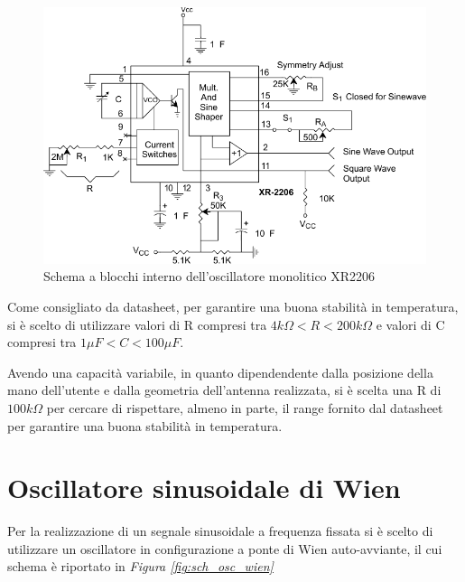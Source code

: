 \documentclass[titlepage]{report}
\begin{document}
	\begin{figure}[h]
		\centering
		\includegraphics[scale=1]{Immagini/schema_xr2206.pdf}
		\caption{Schema a blocchi interno dell'oscillatore monolitico XR2206}
		\label{fig:sch_xr2206_}
	\end{figure}
	\newpage

	\noindent
	Come consigliato da datasheet, per garantire una buona stabilità in temperatura, si è scelto di utilizzare valori di R compresi tra $4k\Omega < R < 200k\Omega$ e valori di C compresi tra $1\mu F < C < 100\mu F$.
	
	\noindent Avendo una capacità variabile, in quanto dipendendente dalla posizione della mano dell'utente e dalla geometria dell'antenna realizzata, si è scelta una R di $100k\Omega$ per cercare di rispettare, almeno in parte, il range fornito dal datasheet per garantire una buona stabilità in temperatura. 

	
\section{Oscillatore sinusoidale di Wien}
	\label{sec:osc_wien}
	Per la realizzazione di un segnale sinusoidale a frequenza fissata si è scelto di utilizzare un oscillatore in configurazione a ponte di Wien auto-avviante, il cui schema è riportato in \textit{Figura \ref{fig:sch_osc_wien}}
	
\end{document}
